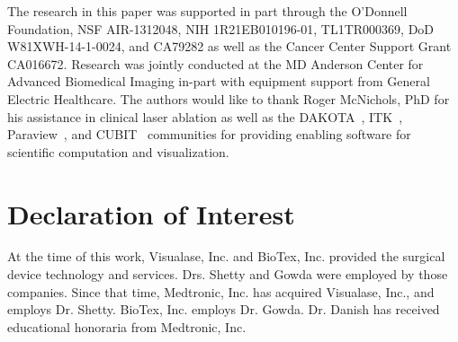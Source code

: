 \documentclass[12pt]{article}
\begin{document}
The research in this paper was supported in part through the O'Donnell Foundation,
NSF AIR-1312048, NIH 1R21EB010196-01, TL1TR000369, DoD W81XWH-14-1-0024,
 and CA79282 as well as the Cancer Center Support
Grant CA016672.
Research was jointly conducted at the MD Anderson Center for Advanced
Biomedical Imaging in-part with equipment support from General Electric
Healthcare.
The authors would like to thank Roger McNichols, PhD 
for his assistance in clinical laser ablation as well as the
DAKOTA~\cite{eldred2007dakota},
ITK~\cite{ITKSoftwareGuideSecondEdition}, 
Paraview~\cite{Paraview}, and
CUBIT~\cite{cubit} communities for providing enabling software for
scientific computation and visualization.  



\section*{Declaration of Interest}

At the time of this work, Visualase, Inc. and BioTex, Inc. provided
the surgical device technology and services. Drs. Shetty and Gowda
were employed by those companies. Since that time, Medtronic, Inc.
has acquired Visualase, Inc., and employs Dr. Shetty. BioTex, Inc.
employs Dr. Gowda. Dr. Danish has received educational honoraria
from Medtronic, Inc.



%
%

\clearpage



\end{document}
